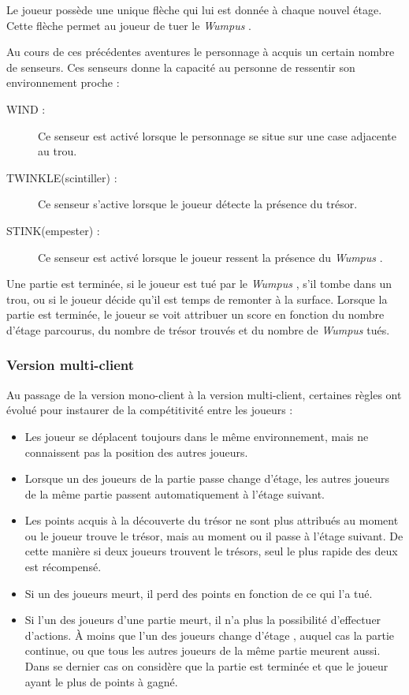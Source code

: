 \documentclass[a4paper,10pt]{article}
\newcommand{\gameName}{\emph{Wumpus }}
\begin{document}
			Le joueur possède une unique flèche qui lui est donnée à chaque nouvel étage. Cette flèche permet au joueur de tuer le \gameName.

			Au cours de ces précédentes aventures le personnage à acquis un certain nombre de senseurs.
			Ces senseurs donne la capacité au personne de ressentir son environnement proche :
			\begin{description}
			\item[WIND :] Ce senseur est activé lorsque le personnage se situe sur une case adjacente au trou.
			\item[TWINKLE(scintiller) :] Ce senseur s'active lorsque le joueur détecte la présence du trésor.
			\item[STINK(empester) :] Ce senseur est activé lorsque le joueur ressent la présence du \gameName.
			\end{description}

			Une partie est terminée, si le joueur est tué par le \gameName, s'il tombe dans un trou, ou si le joueur décide qu'il est temps de remonter à la
	surface. Lorsque la partie est terminée, le joueur se voit attribuer un score en fonction du nombre d'étage parcourus, du nombre de trésor trouvés et du
nombre	de \gameName tués.

		\subsubsection{Version multi-client}
			Au passage de la version mono-client à la version multi-client, certaines règles ont évolué pour instaurer de la compétitivité entre les joueurs :
			\begin{itemize}
				\item Les joueur se déplacent toujours dans le même environnement, mais ne connaissent pas la position des autres joueurs.
				\item Lorsque un des joueurs de la partie passe change d'étage, les autres joueurs de la même partie passent automatiquement à l'étage
suivant.
				\item Les points acquis à la découverte du trésor ne sont plus attribués au moment ou le joueur trouve le trésor, mais au moment ou il passe à
l'étage suivant. De cette manière si deux joueurs trouvent le trésors, seul le plus rapide des deux est récompensé.
				\item Si un des joueurs meurt, il perd des points en fonction de ce qui l'a tué.
				\item Si l'un des joueurs d'une partie meurt, il n'a plus la possibilité d'effectuer d'actions. À moins que l'un des joueurs change d'étage
, auquel cas la partie continue, ou que tous les autres joueurs de la même partie meurent aussi. Dans se dernier cas on considère que la partie est terminée et
que le joueur ayant le plus de points à gagné.
			\end{itemize}
\end{document}
